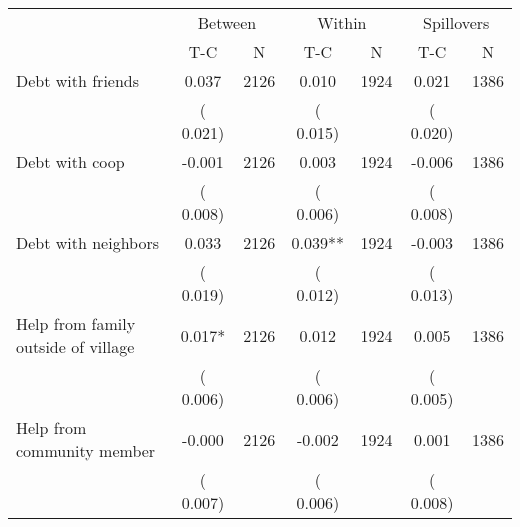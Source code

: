 
\begin{tabular}{l*{6}{c}}\hline&\multicolumn{2}{c}{Between}&\multicolumn{2}{c}{Within}&\multicolumn{2}{c}{Spillovers} \\ \cmidrule(r){2-3}\cmidrule(l){4-5}\cmidrule(l){6-7} & {T-C} & {N} & {T-C} & {N}  & {T-C}  & {N}  \\ \midrule
Debt with friends        &              0.037      &       2126       &              0.010      &       1924       &              0.021      &       1386       \\
                       &       (       0.021)            &                               &       (       0.015)            &                               &       (       0.020)            &                               \\
Debt with coop        &             -0.001      &       2126       &              0.003      &       1924       &             -0.006      &       1386       \\
                       &       (       0.008)            &                               &       (       0.006)            &                               &       (       0.008)            &                               \\
Debt with neighbors        &              0.033      &       2126       &              0.039**      &       1924       &             -0.003      &       1386       \\
                       &       (       0.019)            &                               &       (       0.012)            &                               &       (       0.013)            &                               \\
Help from family outside of village        &              0.017*      &       2126       &              0.012      &       1924       &              0.005      &       1386       \\
                       &       (       0.006)            &                               &       (       0.006)            &                               &       (       0.005)            &                               \\
Help from community member        &             -0.000      &       2126       &             -0.002      &       1924       &              0.001      &       1386       \\
                       &       (       0.007)            &                               &       (       0.006)            &                               &       (       0.008)            &                               \\

\end{tabular}
